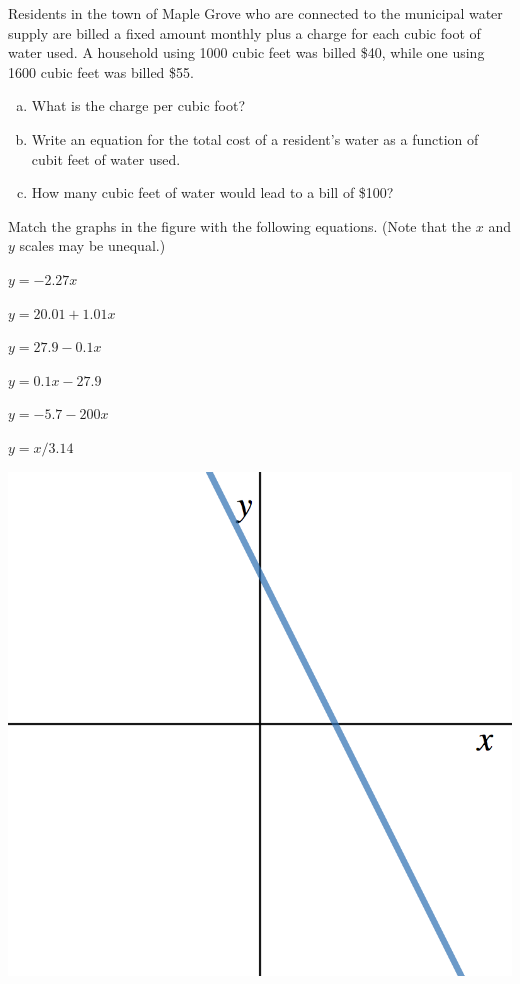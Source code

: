 \documentclass[11pt]{exam}
\theoremstyle{definition}
\begin{document}
\begin{questions}
\vskip 10mm
\pagebreak
\question
	Residents in the town of Maple Grove who are connected to the municipal water supply are billed a fixed amount monthly plus a charge for each cubic foot of water used. A household using 1000 cubic feet was billed \$40, while one using 1600 cubic feet was billed \$55.
\begin{enumerate}[(a)]
\item  What is the charge per cubic foot?
\item Write an equation for the total cost of a resident's water as a function of cubit feet of water used.
  \vspace{1in}
\item How many cubic feet of water would lead to a bill of \$100?
\end{enumerate}
\vspace{-0.5in}
\vspace{1.5in}
\question
	Match the graphs in the figure with the following equations. (Note that the \(x\) and \(y\) scales may be unequal.)
\vskip 5mm
\begin{enumerate}[(a)]
\begin{minipage}{.5\textwidth}
	\item $y=-2.27x$
	\item $y = 20.01+1.01x$
	\item $y=27.9-0.1x$
\end{minipage}
\begin{minipage}{0.5\textwidth}
	\item $y=0.1x-27.9$
	\item $y=-5.7-200x$
	\item $y=x/3.14$
\end{minipage}
\end{enumerate}
\vskip 5mm
\begin{enumerate}[(I)]
	\begin{minipage}{.35\textwidth}
	\item \includegraphics[scale=0.1]{linearI.png}

\end{minipage}
\end{enumerate}
\end{questions}
\end{document}
